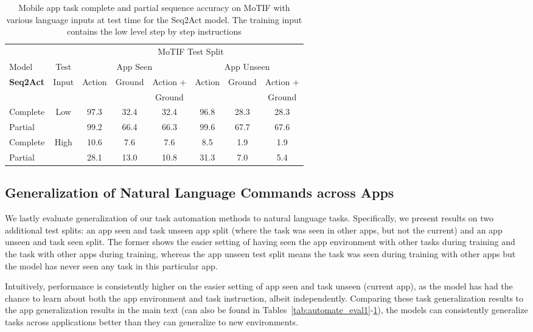 \begin{table}[t]
    \centering
          \renewcommand\arraystretch{0.95}

        \caption{Mobile app task complete and partial sequence accuracy on MoTIF with various language inputs at test time for the Seq2Act model. The training input contains the low level step by step instructions }
    \begin{tabular}{|l|c|c|c|c|c|c|c|}
    \hline
    & & \multicolumn{6}{c|}{MoTIF Test Split}\\
    \cline{3-8}
      Model & Test & \multicolumn{3}{c|}{App Seen} & \multicolumn{3}{c|}{App Unseen}\\
    \cline{3-8}
  \textbf{Seq2Act} & Input & \multirow{2}{*}{Action} & \multirow{2}{*}{Ground} & Action + &  \multirow{2}{*}{Action} & \multirow{2}{*}{Ground} & Action +\\
   & & & & Ground& & & Ground\\
    \hline
    Complete &\multirow{2}{*}{Low} & 97.3 & 32.4 & 32.4 & 96.8 & 28.3 & 28.3 \\
    Partial & & 99.2 & 66.4 & 66.3 & 99.6 & 67.7 & 67.6 \\
    \hline
    Complete & \multirow{2}{*}{High}&  10.6 & 7.6 & 7.6 & 8.5 &1.9&1.9\\
    Partial & & 28.1 & 13.0  & 10.8 &31.3 & 7.0 & 5.4\\
    \hline
    \end{tabular}
    \label{tab:automate_eval3}
\end{table}

\subsection{Generalization of Natural Language Commands across Apps}
\label{sec:task_gen}
We lastly evaluate generalization of our task automation methods to natural language tasks. Specifically, we present results on two additional test splits: an app seen and task unseen app split (where the task was seen in other apps, but not the current) and an app unseen and task seen split. The former shows the easier setting of having seen the app environment with other tasks during training and the task with other apps during training, whereas the app unseen test split means the task was seen during training with other apps but the model has never seen any task in this particular app.

Intuitively, performance is consistently higher on the easier setting of app seen and task unseen (current app), as the model has had the chance to learn about both the app environment and task instruction, albeit independently. Comparing these task generalization results to the app generalization results in the main text (can also be found in Tables~\ref{tab:automate_eval1}-\ref{tab:automate_eval3}), the models can consistently generalize tasks across applications better than they can generalize to new environments. 

